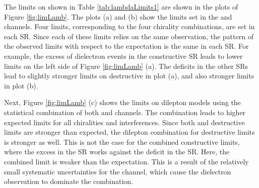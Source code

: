 The limits on \lam shown in Table \ref{tab:lambdaLimits1} are shown in the plots of Figure \ref{fig:limLamb}.
The plots (a) and (b) show the limits set in the \ee and \mm channels.
Four limits, corresponding to the four chirality combinations, are set in each SR.
Since each of these limits relies on the same observation, the pattern of the observed limits with respect to the expectation is the same in each SR.
For example, the excess of dielectron events in the \ee constructive SR leads to lower limits on the left side of Figure \ref{fig:limLamb} (a).
The deficits in the other SRs lead to slightly stronger limits on destructive \lam in plot (a), and also stronger \mm limits in plot (b).

Next, Figure \ref{fig:limLamb} (c) shows the limits on dilepton models using the statistical combination of both \ee and \mm channels.
The combination leads to higher expected limits for all chiralities and interferences.
Since both \ee and \mm destructive limits are stronger than expected, the dilepton combination for destructive limits is stronger as well.
This is not the case for the combined constructive limits, where the excess in the \ee SR works against the deficit in the \mm SR.
Here, the combined limit is weaker than the expectation.
This is a result of the relatively small systematic uncertainties for the \ee channel, which cause the dielectron observation to dominate the combination.

